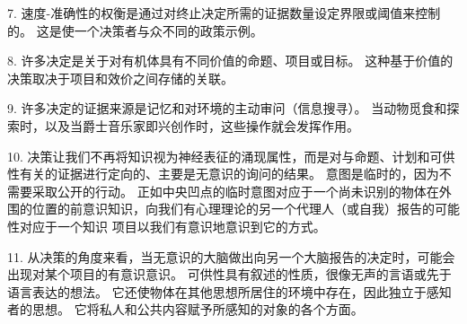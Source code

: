 7. 速度-准确性的权衡是通过对终止决定所需的证据数量设定界限或阈值来控制的。
这是使一个决策者与众不同的政策示例。


8. 许多决定是关于对有机体具有不同价值的命题、项目或目标。
这种基于价值的决策取决于项目和效价之间存储的关联。 


9. 许多决定的证据来源是记忆和对环境的主动审问（信息搜寻）。
当动物觅食和探索时，以及当爵士音乐家即兴创作时，这些操作就会发挥作用。


10. 决策让我们不再将知识视为神经表征的涌现属性，而是对与命题、计划和可供性有关的证据进行定向的、主要是无意识的询问的结果。
意图是临时的，因为不需要采取公开的行动。
正如中央凹点的临时意图对应于一个尚未识别的物体在外围的位置的前意识知识，向我们有心理理论的另一个代理人（或自我）报告的可能性对应于一个知识 项目以我们有意识地意识到它的方式。


11. 从决策的角度来看，当无意识的大脑做出向另一个大脑报告的决定时，可能会出现对某个项目的有意识意识。
可供性具有叙述的性质，很像无声的言语或先于语言表达的想法。
它还使物体在其他思想所居住的环境中存在，因此独立于感知者的思想。
它将私人和公共内容赋予所感知的对象的各个方面。


